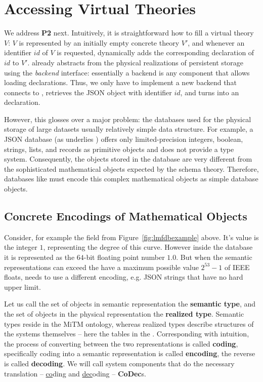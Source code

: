 \section{Accessing Virtual Theories}\label{sec:access}

We address \textbf{P2} next.
Intuitively, it is straightforward how to fill a virtual theory $V$: $V$ is represented by an initially empty concrete theory $V'$, and whenever an identifier $id$ of $V$ is requested, \mmt dynamically adds the corresponding declaration of $id$ to $V'$.
\mmt already abstracts from the physical realizations of persistent storage using the \emph{backend} interface: essentially a backend is any component that allows loading declarations.
Thus, we only have to implement a new backend that connects to \lmfdb, retrieves the JSON object with identifier $id$, and turns into an \ommt declaration.

However, this glosses over a major problem: the databases used for the physical storage of large datasets usually relatively simple data structure.
For example, a JSON database (as underlies \lmfdb) offers only limited-precision integers, boolean, strings, lists, and records as primitive objects and does not provide a type system.
Consequently, the objects stored in the database are very different from the sophisticated mathematical objects expected by the schema theory.
Therefore, databases like \lmfdb must encode this complex mathematical objects as simple database objects.

\subsection{Concrete Encodings of Mathematical Objects}\label{sec:vt:translation}

Consider, for example the  field from Figure~\ref{fig:lmfdbexample} above. 
It's value is the integer $1$, representing the degree of this curve. 
However inside the database it is represented as the  $64$-bit floating point number $1.0$. 
But when the semantic representations can exceed the have a maximum possible value $2^{53}-1$ of IEEE floats, \lmfdb needs to use a different encoding, e.g. JSON strings that have no hard upper limit.

Let us call the set of objects in semantic representation the \textbf{semantic type}, and the set of objects in the physical representation the \textbf{realized type}. 
Semantic types reside in the MiTM ontology, whereas realized types describe structures of the systems themselves -- here the tables in the \lmfdb. 
Corresponding with intuition, the process of converting between the two representations is called \textbf{coding}, specifically coding into a semantic representation is called \textbf{encoding}, the reverse is called \textbf{decoding}. 
We will call system components that do the necessary translation -- \underline{co}ding and \underline{dec}oding -- \textbf{CoDec}s. 

